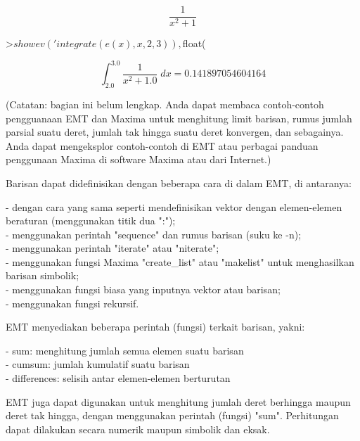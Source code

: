 \documentclass[a4paper,10pt]{article}
\begin{document}
\begin{eulernotebook}
\begin{eulercomment}
\begin{eulercomment}
\begin{eulercomment}
\begin{eulercomment}
\begin{eulercomment}
\begin{eulercomment}
\begin{eulercomment}
\begin{eulercomment}
\begin{eulerformula}
\[
\frac{1}{x^2+1}
\]
\end{eulerformula}
\begin{eulerprompt}
>$showev('integrate(e(x),x,2,3)), $float(%
\end{eulerprompt}
\begin{eulerformula}
\[
\int_{2.0}^{3.0}{\frac{1}{x^2+1.0}\;dx}=0.141897054604164
\]
\end{eulerformula}
\begin{eulercomment}
(Catatan: bagian ini belum lengkap. Anda dapat membaca contoh-contoh pengguanaan EMT dan
Maxima untuk menghitung limit barisan, rumus jumlah parsial suatu deret, jumlah tak hingga
suatu deret konvergen, dan sebagainya. Anda dapat mengeksplor contoh-contoh di EMT atau
perbagai panduan penggunaan Maxima di software Maxima atau dari Internet.)

Barisan dapat didefinisikan dengan beberapa cara di dalam EMT, di antaranya:

- dengan cara yang sama seperti mendefinisikan vektor dengan elemen-elemen beraturan
(menggunakan titik dua ":");\\
- menggunakan perintah "sequence" dan rumus barisan (suku ke -n);\\
- menggunakan perintah "iterate" atau "niterate";\\
- menggunakan fungsi Maxima "create\_list" atau "makelist" untuk menghasilkan barisan
simbolik;\\
- menggunakan fungsi biasa yang inputnya vektor atau barisan;\\
- menggunakan fungsi rekursif.

EMT menyediakan beberapa perintah (fungsi) terkait barisan, yakni:

- sum: menghitung jumlah semua elemen suatu barisan\\
- cumsum: jumlah kumulatif suatu barisan\\
- differences: selisih antar elemen-elemen berturutan

EMT juga dapat digunakan untuk menghitung jumlah deret berhingga maupun deret tak hingga,
dengan menggunakan perintah (fungsi) "sum". Perhitungan dapat dilakukan secara numerik
maupun simbolik dan eksak.


\end{eulercomment}
\end{eulercomment}
\end{eulercomment}
\end{eulercomment}
\end{eulercomment}
\end{eulercomment}
\end{eulercomment}
\end{eulercomment}
\end{eulercomment}
\end{eulernotebook}
\end{document}
